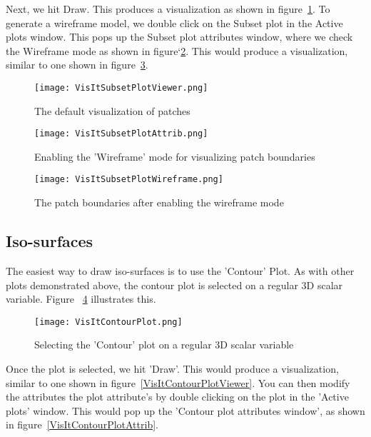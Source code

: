 Next, we hit Draw. This produces a visualization as shown in figure~\ref{VisItSubsetPlotViewer}. To generate a wireframe model, we double click on the Subset plot in the Active plots window. This pops up the Subset plot attributes window, where we check the Wireframe mode as shown in figure`\ref{VisItSubsetPlotAttrib}. This would produce a visualization, similar to one shown in figure~\ref{VisItSubsetPlotWireframe}.

\begin{figure}
  \center
  \texttt{[image: VisItSubsetPlotViewer.png]}
  \caption{The default visualization of patches} 
  \label{VisItSubsetPlotViewer}
\end{figure}

\begin{figure}
  \center
  \texttt{[image: VisItSubsetPlotAttrib.png]}
  \caption{Enabling the 'Wireframe' mode for visualizing patch boundaries}
  \label{VisItSubsetPlotAttrib}
\end{figure}

\begin{figure}
  \center
  \texttt{[image: VisItSubsetPlotWireframe.png]}
  \caption{The patch boundaries after enabling the wireframe mode}
  \label{VisItSubsetPlotWireframe}
\end{figure}

\subsection{Iso-surfaces}

The easiest way to draw iso-surfaces is to use the 'Contour' Plot. As with other plots demonstrated above, the contour plot is selected on a regular 3D scalar variable. Figure ~\ref{VisItContourPlot} illustrates this. 

\begin{figure}
  \center
  \texttt{[image: VisItContourPlot.png]}
  \caption{Selecting the 'Contour' plot on a regular 3D scalar variable}
  \label{VisItContourPlot}
\end{figure}

Once the plot is selected, we hit 'Draw'. This would produce a visualization, similar to one shown in figure~\ref{VisItContourPlotViewer}. You can then modify the attributes the plot attribute's by double clicking on the plot in the 'Active plots' window. This would pop up the 'Contour plot attributes window', as shown in figure~\ref{VisItContourPlotAttrib}. 

